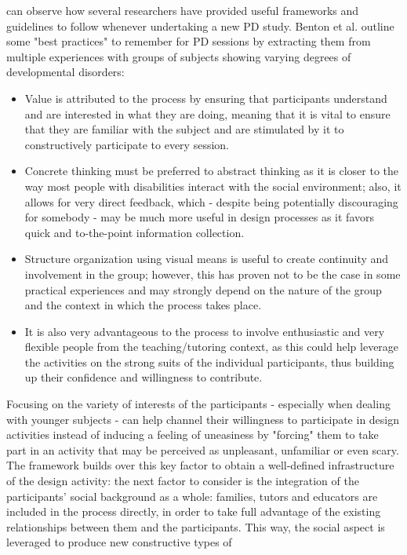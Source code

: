 can observe how several researchers have provided useful frameworks and guidelines to
follow whenever undertaking a new PD study. Benton et al. \cite{Benton2} outline some "best practices" to remember for PD sessions by extracting
them from multiple experiences with groups of subjects showing varying degrees of
developmental disorders:
\begin{itemize}
\item Value is attributed to the process by ensuring that participants understand and
are interested in what they are doing, meaning that it is vital to ensure that they
are familiar with the subject and are stimulated by it to constructively participate
to every session.
\item Concrete thinking must be preferred to abstract thinking as it is closer to the way
most people with disabilities interact with the social environment; also, it allows
for very direct feedback, which - despite being potentially discouraging for
somebody - may be much more useful in design processes as it favors quick and
to-the-point information collection.
\item Structure organization using visual means is useful to create continuity and
involvement in the group; however, this has proven not to be the case in some
practical experiences \cite{Malinverni} and may strongly depend on the nature of the group
and the context in which the process takes place.
\item It is also very advantageous to the process to involve enthusiastic and very flexible
people from the teaching/tutoring context, as this could help leverage the activities
on the strong suits of the individual participants, thus building up their confidence
and willingness to contribute.
\end{itemize}
Focusing on the
variety of interests of the participants - especially when dealing with younger subjects -
can help channel their willingness to participate in design activities instead of inducing a
feeling of uneasiness by "forcing" them to take part in an activity that may be perceived
as unpleasant, unfamiliar or even scary. The framework builds over this key factor to obtain a well-defined infrastructure of the
design activity: the next factor to consider is the integration of the participants' social
background as a whole: families, tutors and educators are included in the process directly,
in order to take full advantage of the existing relationships between them and the
participants. This way, the social aspect is leveraged to produce new constructive types of
